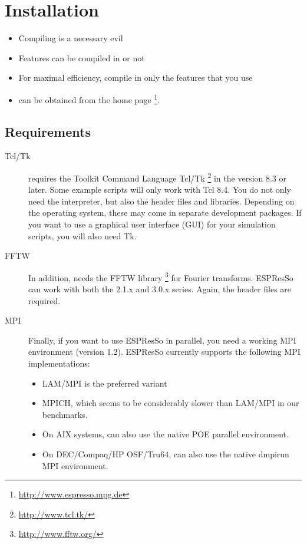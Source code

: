 \chapter{Installation}
\label{chap:install}

\begin{itemize}
\item Compiling \es{} is a necessary evil
\item Features can be compiled in or not
\item For maximal efficiency, compile in only the features that you
  use
\item \es{} can be obtained from the \es{} home page
  \footnote{\url{http://www.espresso.mpg.de}}.
\end{itemize}



\section{Requirements}
\label{sec:requirements}

\begin{description}
\item[Tcl/Tk]  \es{} requires the Toolkit Command
  Language Tcl/Tk \footnote{\url{http://www.tcl.tk/}} in the version
  8.3 or later.  Some example scripts will only work with Tcl 8.4. You
  do not only need the interpreter, but also the header files and
  libraries.  Depending on the operating system, these may come in
  separate development packages. If you want to use a graphical user
  interface (GUI) for your simulation scripts, you will also need Tk.
  
\item[FFTW]  In addition, \es{} needs the FFTW library
  \footnote{\url{http://www.fftw.org/}} for Fourier transforms.
  ESPResSo can work with both the 2.1.x and 3.0.x series. Again, the
  header files are required.
  
\item[MPI]  Finally, if you want to use ESPResSo in
  parallel, you need a working MPI environment (version 1.2). ESPResSo
  currently supports the following MPI implementations:
  \begin{itemize}
  \item LAM/MPI is the preferred variant
  \item MPICH, which seems to be considerably slower than LAM/MPI in
    our benchmarks.
  \item On AIX systems, \es{} can also use the native POE parallel
    environment.
  \item On DEC/Compaq/HP OSF/Tru64, \es{} can also use the native
    dmpirun MPI environment.
  \end{itemize}
\end{description}

